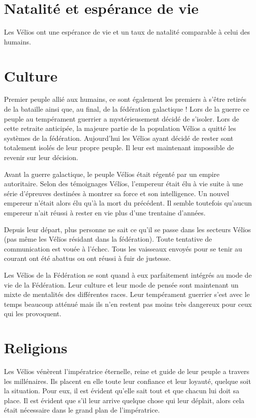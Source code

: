 \begin{multicols}{2}
\section{Natalité et espérance de vie}

Les Vélïos ont une espérance de vie et un taux de natalité comparable à celui des humains.

\section{Culture}

Premier peuple allié aux humains, ce sont également les premiers à s'être retirés de la bataille ainsi que, au final, de la fédération galactique ! Lors de la guerre ce peuple au tempérament guerrier a mystérieusement décidé de s'isoler. Lors de cette retraite anticipée, la majeure partie de la population Vélïos a quitté les systèmes de la fédération. Aujourd'hui les Vélïos ayant décidé de rester sont totalement isolés de leur propre peuple. Il leur est maintenant impossible de revenir sur leur décision.

Avant la guerre galactique, le peuple Vélïos était régenté par un empire autoritaire. Selon des témoignages Vélïos, l'empereur était élu à vie suite à une série d'épreuves destinées à montrer sa force et son intelligence. Un nouvel empereur n'était alors élu qu'à la mort du précédent. Il semble toutefois qu'aucun empereur n'ait réussi à rester en vie plus d'une trentaine d'années.

Depuis leur départ, plus personne ne sait ce qu'il se passe dans les secteurs Vélïos (pas même les Vélïos résidant dans la fédération). Toute tentative de communication est vouée à l'échec. Tous les vaisseaux envoyés pour se tenir au courant ont été abattus ou ont réussi à fuir de justesse.

Les Vélïos de la Fédération se sont quand à eux parfaitement intégrés au mode de vie de la Fédération. Leur culture et leur mode de pensée sont maintenant un mixte de mentalités des différentes races. Leur tempérament guerrier s'est avec le temps beaucoup atténué mais ils n'en restent pas moins très dangereux pour ceux qui les provoquent. 

\section{Religions}

Les Vélïos vénèrent l'impératrice éternelle, reine et guide de leur peuple a travers les millénaires. Ils placent en elle toute leur confiance et leur loyauté, quelque soit la situation. Pour eux, il est évident qu'elle sait tout et que chacun lui doit sa place. Il est évident que s'il leur arrive quelque chose qui leur déplait, alors cela était nécessaire dans le grand plan de l'impératrice.


\end{multicols}
